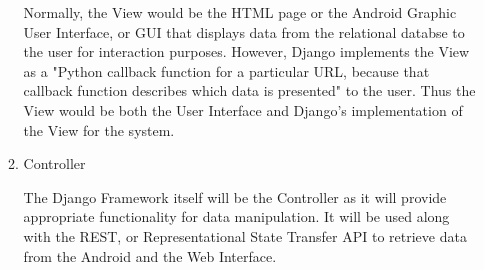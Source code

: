 \documentclass{article}
\begin{document}
\begin{itemize}
\begin{enumerate}
Normally, the View would be the HTML page or the Android Graphic User Interface, or GUI that displays data from the relational databse to the user for interaction purposes. However, Django implements the View as a "Python callback function for a particular  URL, because that callback function describes which data is presented" to the user. Thus the View would be both the User Interface and Django's  implementation of the View for the system.
\newline
\item{Controller}

The Django Framework itself will be the Controller as it will provide appropriate functionality for data manipulation. It will be used along with the REST, or Representational State Transfer API to retrieve data from the Android and the Web Interface.

\end{enumerate}
\end{itemize}
\end{document}
